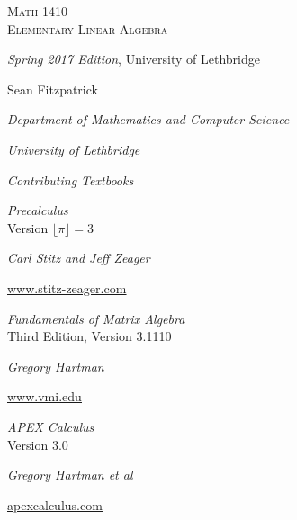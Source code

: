 
\hskip 125pt\begin{minipage}{\textwidth}
\begin{flushright}

\textsc{{\Huge Math 1410 \\
Elementary Linear Algebra}} \\

\bigskip

\textsl{\Large Spring 2017 Edition}, 
{\Large University of Lethbridge}\\


\bigskip

\Large
\vspace{1in}

Sean Fitzpatrick

\emph{\large Department of Mathematics and Computer Science}

\emph{\large University of Lethbridge}\vskip15pt

\parbox{200pt}{\textit{Contributing Textbooks}}\hskip 2cm \phantom{.}

\vspace{0.5in}

\textit{Precalculus}\\
{\large Version $\lfloor \pi\rfloor = 3$}

\emph{\large Carl Stitz and Jeff Zeager}

{\large \href{http://www.stitz-zeager.com}{\underline{www.stitz-zeager.com}}}\vskip 15pt

\textit{Fundamentals of Matrix Algebra}\\
{\large Third Edition, Version 3.1110}

\emph{\large Gregory Hartman}

{\large \href{http://www.vmi.edu/academics/departments/applied-mathematics/affordable-textbooks-apex/}{\underline{www.vmi.edu}}}\vskip 15pt

\textit{APEX Calculus}\\
{\large Version 3.0}

\emph{\large Gregory Hartman et al}

{\large \href{http://www.apexcalculus.com}{\underline{apexcalculus.com}}}\vskip 15pt


\normalsize
\end{flushright}
\end{minipage}

